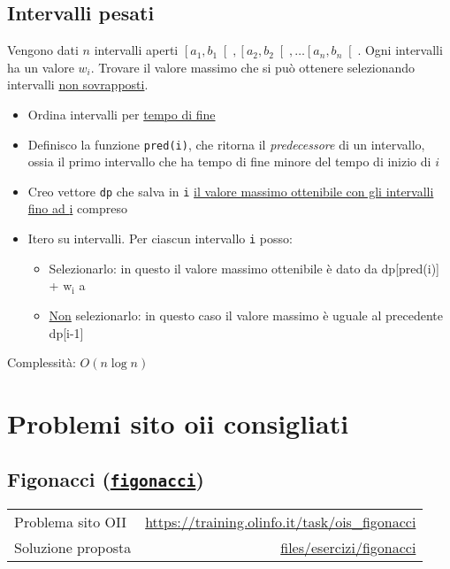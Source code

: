 \subsection{Intervalli pesati}\label{intervalli pesati}
Vengono dati $ n $ intervalli aperti $ \left[a_1, b_1\right[, \left[a_2, b_2\right[ , \ldots  \left[a_n, b_n\right[ $. Ogni intervalli ha un valore $ w_i $. Trovare il valore massimo che si può ottenere selezionando intervalli \underline{non sovrapposti}.

\vskip3mm\vskip3mm
\begin{itemize}
	\item Ordina intervalli per \underline{tempo di fine}
	\item Definisco la funzione \verb|pred(i)|, che ritorna il \textit{predecessore} di un intervallo, ossia il primo intervallo che ha tempo di fine minore del tempo di inizio di $ i $
	\item Creo vettore \verb|dp| che salva in \verb|i| \underline{il valore massimo ottenibile con gli intervalli fino ad {\ttfamily i}} compreso
	\item Itero su intervalli. Per ciascun intervallo \verb|i| posso:
	      \begin{itemize}
		      \item Selezionarlo: in questo il valore massimo ottenibile è dato da {\ttfamily dp[pred(i)] + $ \text{w}_{\text{i}} $} a
		      \item \underline{Non} selezionarlo: in questo caso il valore massimo è uguale al precedente {\ttfamily dp[i-1]}
	      \end{itemize}
\end{itemize}
Complessità: $ O\left(n \log n\right) $

\section{Problemi sito oii consigliati}
\subsection{Figonacci {(\protect\texttt{\href{https://training.olinfo.it/task/ois_figonacci}{figonacci}})}}
\begin{center}
	\begin{tabularx}{\textwidth}{X r}
		\toprule
		Problema sito OII  & \url{https://training.olinfo.it/task/ois_figonacci}                       \\
		Soluzione proposta & \ttfamily\href{run:./files/esercizi/figonacci/}{files/esercizi/figonacci} \\
		\bottomrule
	\end{tabularx}
\end{center}

